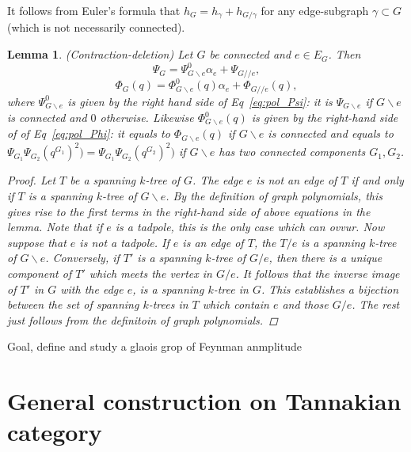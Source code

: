 \documentclass[11pt]{article}
\newtheorem{lemma}[thm]{Lemma}
\begin{document}
It follows from Euler's formula that
$h_G=h_\gamma+h_{G/\gamma}$
for any edge-subgraph $\gamma\subset G$ (which is not necessarily connected).
\begin{lemma}
(Contraction-deletion) Let $G$ be connected and $e\in E_G$. Then
$$
\Psi_G=\Psi_{G\backslash e}^0\alpha_e+\Psi_{G//e},
$$
$$
\Phi_G(q)=\Phi^0_{G\backslash e}(q)\alpha_e+\Phi_{G//e}(q),
$$
where $\Psi_{G\backslash e}^0$ is given by the right hand side of Eq~\ref{eq:pol_Psi}: it is $\Psi_{G\backslash e}$ if $G\backslash e$ is connected and $0$ otherwise. Likewise $\Phi_{G\backslash e}^0(q)$ is given by the right-hand side of of Eq~\ref{eq:pol_Phi}: it equals to $\Phi_{G\backslash e}(q)$ if $G\backslash e$ is connected and equals to $\Psi_{G_1}\Psi_{G_2}(q^{G_1})^2)=\Psi_{G_1}\Psi_{G_2}(q^{G_2})^2)$ if $G\backslash e$ has two connected components $G_1, G_2$.
\begin{proof}


Let $T$ be a spanning $k$-tree of $G$. The edge $e$ is not an edge of $T$ if and only if $T$ is a spanning $k$-tree of $G\backslash e$. By the definition of graph polynomials, this gives rise to the first terms in the right-hand side of above equations in the lemma. Note that if $e$ is a tadpole, this is the only case which can ovvur. Now suppose that $e$ is not a tadpole. If $e$ is an edge of $T$, the $T/e$ is a spanning $k$-tree of $G\backslash e$. Conversely, if $T'$ is a spanning $k$-tree of $G/e$, then there is a unique component of $T'$ which meets the vertex in $G/e$. It follows that the inverse image of $T'$ in $G$ with the edge $e$, is a spanning $k$-tree in $G$. This establishes a bijection between the set of spanning $k$-trees in $T$ which contain $e$ and those $G/e$. The rest just follows from the definitoin of graph polynomials.
\end{proof} 
\end{lemma}


Goal, define and study a glaois grop of Feynman anmplitude

\section{General construction on Tannakian category}
\end{document}
